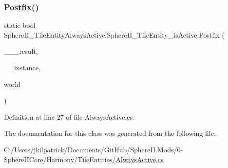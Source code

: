 \subsubsection{\texorpdfstring{Postfix()}{Postfix()}}
{\footnotesize\ttfamily static bool Sphere\+I\+I\+\_\+\+Tile\+Entity\+Always\+Active.\+Sphere\+I\+I\+\_\+\+Tile\+Entity\+\_\+\+Is\+Active.\+Postfix (\begin{DoxyParamCaption}\item[{bool}]{\+\_\+\+\_\+\+\_\+result,  }\item[{Tile\+Entity}]{\+\_\+\+\_\+instance,  }\item[{World}]{world }\end{DoxyParamCaption})\hspace{0.3cm}{\ttfamily [static]}}



Definition at line 27 of file Always\+Active.\+cs.



The documentation for this class was generated from the following file\+:\begin{DoxyCompactItemize}
\item 
C\+:/\+Users/jkilpatrick/\+Documents/\+Git\+Hub/\+Sphere\+I\+I.\+Mods/0-\/\+Sphere\+I\+I\+Core/\+Harmony/\+Tile\+Entities/\mbox{\hyperlink{_always_active_8cs}{Always\+Active.\+cs}}\end{DoxyCompactItemize}
